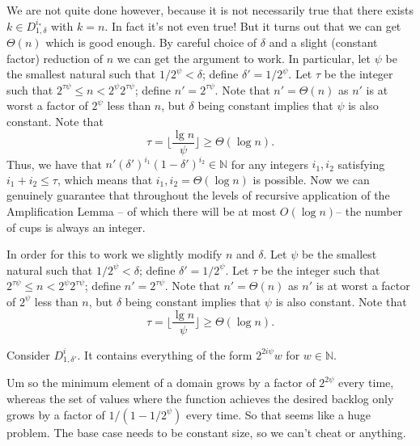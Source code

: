 We are not quite done however, because it is not necessarily
true that there exists $k \in D^{i_*}_{1,\delta}$ with $k = n.$
In fact it's not even true! But it turns out that we can get
$\Theta(n)$ which is good enough. By
careful choice of $\delta$ and a slight (constant factor) reduction of $n$ we can get the
argument to work. In particular, let $\psi$ be the smallest natural such that
$1/2^\psi < \delta$; define $\delta' = 1/2^\psi$. Let $\tau$ be the integer
such that $2^{\tau \psi} \le n < 2^\psi 2^{\tau \psi}$; define $n' =
2^{\tau\psi}$. Note that $n' = \Theta(n)$ as $n'$ is at worst a factor of
$2^\psi$ less than $n$, but $\delta$ being constant implies that $\psi$ is
also constant. Note that $$\tau = \Big\lfloor \frac{\lg
n}{\psi} \Big\rfloor \ge \Theta(\log n).$$
Thus, we have that $n'(\delta')^{i_1}(1-\delta')^{i_2} \in \mathbb{N}$ for any
integers $i_1,i_2$ satisfying $i_1+i_2 \le \tau$, which means
that $i_1,i_2= \Theta(\log n)$ is possible.
Now we can genuinely guarantee that throughout the levels of recursive application of
the Amplification Lemma -- of which there will be at most $O(\log n)$-- the
number of cups is always an integer. 

{\color{red} %
In order for this to work we slightly modify $n$ and $\delta$.
Let $\psi$ be the smallest natural such that
$1/2^\psi < \delta$; define $\delta' = 1/2^\psi$. Let $\tau$ be the integer
such that $2^{\tau \psi} \le n < 2^\psi 2^{\tau \psi}$; define $n' =
2^{\tau\psi}$. Note that $n' = \Theta(n)$ as $n'$ is at worst a factor of
$2^\psi$ less than $n$, but $\delta$ being constant implies that $\psi$ is
also constant. Note that $$\tau = \Big\lfloor \frac{\lg n}{\psi} \Big\rfloor \ge \Theta(\log n).$$

Consider $D^i_{1, \delta'}$. It contains everything of the form
$2^{2i \psi} w$ for $w\in\mathbb{N}$.

Um so the minimum element of a domain grows by a factor of
$2^{2\psi}$ every time, whereas the set of values where the
function achieves the desired backlog only grows by a factor of 
$1/(1-1/2^\psi)$ every time.
So that seems like a huge problem. 
The base case needs to be constant size, so we can't cheat or anything.
}
